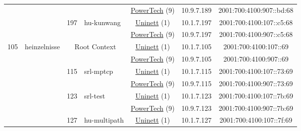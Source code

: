 \begin{small}
\begin{center}
\begin{longtable}{|c|c|c|c|c|c|c|c|}
  &  &  &  & \multicolumn{2}{|c|}{\tiny{\href{http://www.powertech.no}{PowerTech} (9)}} & \tiny{10.9.7.189} & \tiny{2001:700:4100:907::bd:68} \\* \cline{3-3}\cline{4-4}\cline{5-5}\cline{6-6}\cline{7-7}\cline{8-8}
  &  & \multirow{2}{*}{\tiny{197}} & \multicolumn{1}{|l|}{\multirow{2}{*}{\tiny{hu-kunwang}}} & \multicolumn{2}{|c|}{\tiny{\href{https://www.uninett.no}{Uninett} (1)}} & \tiny{10.1.7.197} & \tiny{2001:700:4100:107::c5:68} \\* \cline{5-5}\cline{6-6}\cline{7-7}\cline{8-8}
  &  &  &  & \multicolumn{2}{|c|}{\tiny{\href{http://www.powertech.no}{PowerTech} (9)}} & \tiny{10.9.7.197} & \tiny{2001:700:4100:907::c5:68} \\ \hline
 \multirow{30}{*}{\tiny{105}} & \multicolumn{1}{|l|}{\multirow{30}{*}{\tiny{heinzelnisse}}} & \multicolumn{2}{|c|}{\multirow{2}{*}{\tiny{Root Context}}} & \multicolumn{2}{|c|}{\tiny{\href{https://www.uninett.no}{Uninett} (1)}} & \tiny{10.1.7.105} & \tiny{2001:700:4100:107::69} \\* \cline{5-5}\cline{6-6}\cline{7-7}\cline{8-8}
  &  & \multicolumn{2}{|c|}{} & \multicolumn{2}{|c|}{\tiny{\href{http://www.powertech.no}{PowerTech} (9)}} & \tiny{10.9.7.105} & \tiny{2001:700:4100:907::69} \\* \cline{3-3}\cline{4-4}\cline{5-5}\cline{6-6}\cline{7-7}\cline{8-8}
  &  & \multirow{2}{*}{\tiny{115}} & \multicolumn{1}{|l|}{\multirow{2}{*}{\tiny{srl-mptcp}}} & \multicolumn{2}{|c|}{\tiny{\href{https://www.uninett.no}{Uninett} (1)}} & \tiny{10.1.7.115} & \tiny{2001:700:4100:107::73:69} \\* \cline{5-5}\cline{6-6}\cline{7-7}\cline{8-8}
  &  &  &  & \multicolumn{2}{|c|}{\tiny{\href{http://www.powertech.no}{PowerTech} (9)}} & \tiny{10.9.7.115} & \tiny{2001:700:4100:907::73:69} \\* \cline{3-3}\cline{4-4}\cline{5-5}\cline{6-6}\cline{7-7}\cline{8-8}
  &  & \multirow{2}{*}{\tiny{123}} & \multicolumn{1}{|l|}{\multirow{2}{*}{\tiny{srl-test}}} & \multicolumn{2}{|c|}{\tiny{\href{https://www.uninett.no}{Uninett} (1)}} & \tiny{10.1.7.123} & \tiny{2001:700:4100:107::7b:69} \\* \cline{5-5}\cline{6-6}\cline{7-7}\cline{8-8}
  &  &  &  & \multicolumn{2}{|c|}{\tiny{\href{http://www.powertech.no}{PowerTech} (9)}} & \tiny{10.9.7.123} & \tiny{2001:700:4100:907::7b:69} \\* \cline{3-3}\cline{4-4}\cline{5-5}\cline{6-6}\cline{7-7}\cline{8-8}
  &  & \multirow{2}{*}{\tiny{127}} & \multicolumn{1}{|l|}{\multirow{2}{*}{\tiny{hu-multipath}}} & \multicolumn{2}{|c|}{\tiny{\href{https://www.uninett.no}{Uninett} (1)}} & \tiny{10.1.7.127} & \tiny{2001:700:4100:107::7f:69} \\* \cline{5-5}\cline{6-6}\cline{7-7}\cline{8-8}

\end{longtable}
\end{center}
\end{small}
